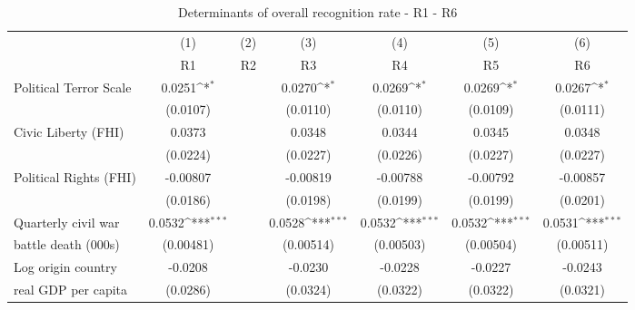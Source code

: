 \begin{table}[!ht]\centering \scriptsize
\def\sym#1{\ifmmode^{#1}\else\(^{#1}\)\fi}
\caption{Determinants of overall recognition rate - R1 - R6}
\begin{tabular}{l*{6}{c}}
\hline\hline
	&\multicolumn{1}{c}{(1)}     &\multicolumn{1}{c}{(2)}       &\multicolumn{1}{c}{(3)}       &\multicolumn{1}{c}{(4)}    	&\multicolumn{1}{c}{(5)}  	&\multicolumn{1}{c}{(6)}   \\
                    &\multicolumn{1}{c}{R1}&\multicolumn{1}{c}{R2}&\multicolumn{1}{c}{R3}&\multicolumn{1}{c}{R4}&\multicolumn{1}{c}{R5}&\multicolumn{1}{c}{R6}\\
\hline
Political Terror Scale&      0.0251\sym{*}  &                     &      0.0270\sym{*}  &      0.0269\sym{*}  &      0.0269\sym{*}  &      0.0267\sym{*}  \\
                    &    (0.0107)         &                     &    (0.0110)         &    (0.0110)         &    (0.0109)         &    (0.0111)         \\
[0.5em]
Civic Liberty (FHI) &      0.0373         &                     &      0.0348         &      0.0344         &      0.0345         &      0.0348         \\
                    &    (0.0224)         &                     &    (0.0227)         &    (0.0226)         &    (0.0227)         &    (0.0227)         \\
[0.5em]
Political Rights (FHI)&    -0.00807         &                     &    -0.00819         &    -0.00788         &    -0.00792         &    -0.00857         \\
                    &    (0.0186)         &                     &    (0.0198)         &    (0.0199)         &    (0.0199)         &    (0.0201)         \\
[0.5em]
Quarterly civil war &      0.0532\sym{***}&                     &      0.0528\sym{***}&      0.0532\sym{***}&      0.0532\sym{***}&      0.0531\sym{***}\\
battle death (000s)                    &   (0.00481)         &                     &   (0.00514)         &   (0.00503)         &   (0.00504)         &   (0.00511)         \\
[0.5em]
Log origin country &     -0.0208         &                     &     -0.0230         &     -0.0228         &     -0.0227         &     -0.0243         \\
real GDP per capita                    &    (0.0286)         &                     &    (0.0324)         &    (0.0322)         &    (0.0322)         &    (0.0321)         \\

\end{tabular}
\end{table}
